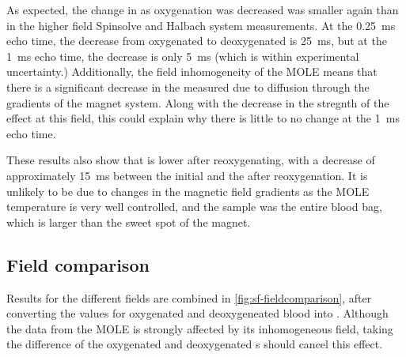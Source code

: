 As expected, the change in \Ttwo as oxygenation was decreased was smaller again than in the higher field Spinsolve and Halbach system measurements.
At the \SI{0.25}{ms} echo time, the decrease from oxygenated to deoxygenated is \SI{25}{ms}, but at the \SI{1}{ms} echo time, the decrease is only \SI{5}{ms} (which is within experimental uncertainty.)
Additionally, the field inhomogeneity of the MOLE means that there is a significant decrease in the measured \Ttwo due to diffusion through the gradients of the magnet system.
Along with the decrease in the stregnth of the effect at this field, this could explain why there is little to no change at the \SI{1}{ms} echo time.

These results also show that \Ttwo is lower after reoxygenating, with a decrease of approximately \SI{15}{ms} between the initial \Ttwo and the \Ttwo after reoxygenation.
It is unlikely to be due to changes in the magnetic field gradients as the MOLE temperature is very well controlled, and the sample was the entire blood bag, which is larger than the sweet spot of the magnet.

\subsection{Field comparison}
Results for the different fields are combined in \autoref{fig:sf-fieldcomparison}, after converting the \Ttwo values for oxygenated and deoxygeneated blood into \Rtwo.
Although the data from the MOLE is strongly affected by its inhomogeneous field, taking the difference of the oxygenated and deoxygenated \Rtwo{}s should cancel this effect.

